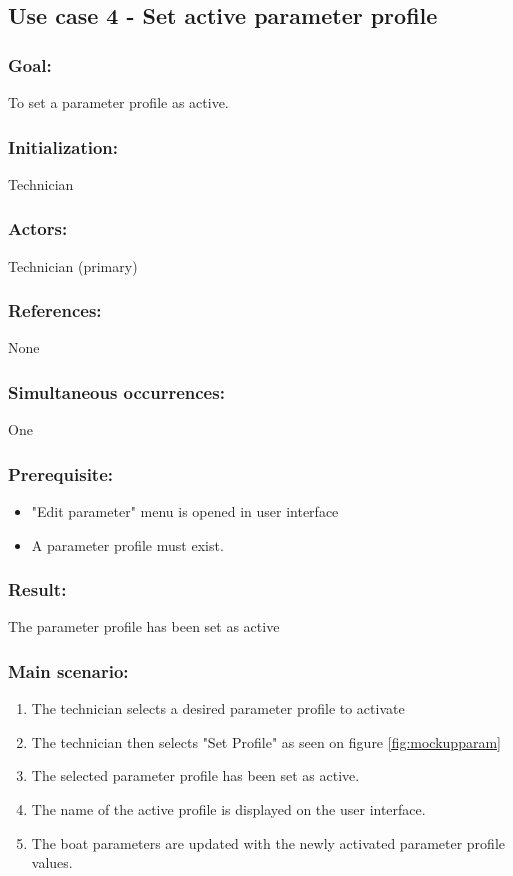 \begin{framed}
	\subsection{Use case 4 - Set active parameter profile}
	\subsubsection*{Goal:}
	To set a parameter profile as active.
	
	\subsubsection*{Initialization:}
	Technician
	
	\subsubsection*{Actors:}
	Technician (primary)
	
	\subsubsection*{References:}
	None
	
	\subsubsection*{Simultaneous occurrences:}
	One
	
	\subsubsection*{Prerequisite:}
	\begin{itemize}
		\item "Edit parameter" menu is opened in user interface
		\item A parameter profile must exist.
	\end{itemize}
	
	\subsubsection*{Result:}
	The parameter profile has been set as active
	
	\subsubsection*{Main scenario:}
	\begin{enumerate}
		\item The technician selects a desired parameter profile to activate
		\item The technician then selects "Set Profile" as seen on figure \ref{fig:mockupparam}
		\item The selected parameter profile has been set as active.
		\item The name of the active profile is displayed on the user interface.
		\item The boat parameters are updated with the newly activated parameter profile values.
	\end{enumerate}
\end{framed}

